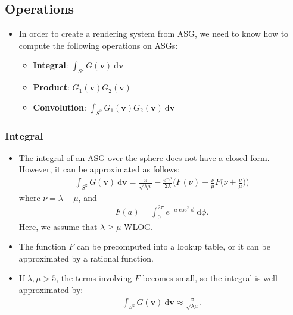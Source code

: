 \documentclass[10pt]{article}
\newcommand{\dee}{\mathrm{d}}
\newcommand{\ve}[1]{\mathbf{#1}}
\begin{document}
  \subsection{Operations}
  
  \begin{itemize}
    \item In order to create a rendering system from ASG, we need to know how to compute the following operations on ASGs:
    \begin{itemize}
      \item \textbf{Integral}: $\int_{S^2} G(\ve{v})\ \dee\ve{v}$
      \item \textbf{Product}: $G_1(\ve{v}) G_2(\ve{v})$
      \item \textbf{Convolution}: $\int_{S^2} G_1(\ve{v}) G_2(\ve{v})\ \dee\ve{v}$
    \end{itemize}    
  \end{itemize}

  \subsubsection{Integral}

  \begin{itemize}
    \item The integral of an ASG over the sphere does not have a closed form.  However, it can be approximated as follows:
    \begin{align*}
      \int_{S^2} G(\ve{v})\ \dee\ve{v} = \frac{\pi}{\sqrt{\lambda\mu}} - \frac{e^{-\mu}}{2\lambda} \bigg( F(\nu) + \frac{\nu}{\mu} F\Big( \nu + \frac{\nu}{\mu} \Big)  \bigg)
    \end{align*}
    where $\nu = \lambda - \mu$, and
    \begin{align*}
      F(a) = \int_{0}^{2\pi} e^{-a \cos^2 \phi}\ \dee\phi.
    \end{align*}
    Here, we assume that $\lambda \geq \mu$ WLOG.

    \item The function $F$ can be precomputed into a lookup table, or it can be approximated by a rational function.

    \item If $\lambda, \mu > 5$, the terms involving $F$ becomes small, so the integral is well approximated by:
    \begin{align*}
      \int_{S^2} G(\ve{v})\ \dee\ve{v} \approx \frac{\pi}{\sqrt{\lambda \mu}}.
    \end{align*}
  \end{itemize}
\end{document}
